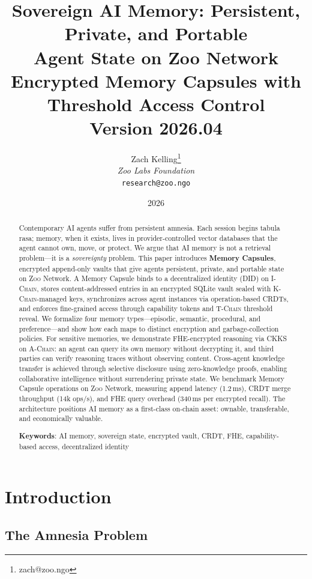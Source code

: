 \documentclass[11pt,letterpaper]{article}
\title{\textbf{Sovereign AI Memory: Persistent, Private, and Portable\\Agent State on Zoo Network}\\
\large Encrypted Memory Capsules with Threshold Access Control\\
\vspace{5pt}
\normalsize Version 2026.04}
\author{
Zach Kelling\thanks{zach@zoo.ngo}\\
\textit{Zoo Labs Foundation}\\
\texttt{research@zoo.ngo}
}
\date{2026}
\theoremstyle{definition}
\theoremstyle{remark}
\newcommand{\Zoo}{\textsc{Zoo}}
\newcommand{\AChain}{\textsc{A-Chain}}
\newcommand{\IChain}{\textsc{I-Chain}}
\newcommand{\KChain}{\textsc{K-Chain}}
\newcommand{\TChain}{\textsc{T-Chain}}
\newcommand{\CKKS}{\textsc{CKKS}}
\newcommand{\CRDT}{\textsc{CRDT}}
\newcommand{\DID}{\textsc{DID}}
\newcommand{\FHE}{\textsc{FHE}}
\begin{document}
\zoocoverpage

\begin{abstract}
Contemporary AI agents suffer from persistent amnesia. Each session begins tabula rasa; memory, when it exists, lives in provider-controlled vector databases that the agent cannot own, move, or protect. We argue that AI memory is not a retrieval problem---it is a \emph{sovereignty} problem. This paper introduces \textbf{Memory Capsules}, encrypted append-only vaults that give agents persistent, private, and portable state on \Zoo{} Network. A Memory Capsule binds to a decentralized identity (\DID{}) on \IChain{}, stores content-addressed entries in an encrypted SQLite vault sealed with \KChain{}-managed keys, synchronizes across agent instances via operation-based \CRDT{}s, and enforces fine-grained access through capability tokens and \TChain{} threshold reveal. We formalize four memory types---episodic, semantic, procedural, and preference---and show how each maps to distinct encryption and garbage-collection policies. For sensitive memories, we demonstrate \FHE{}-encrypted reasoning via \CKKS{} on \AChain{}: an agent can query its own memory without decrypting it, and third parties can verify reasoning traces without observing content. Cross-agent knowledge transfer is achieved through selective disclosure using zero-knowledge proofs, enabling collaborative intelligence without surrendering private state. We benchmark Memory Capsule operations on \Zoo{} Network, measuring append latency (1.2\,ms), \CRDT{} merge throughput (14k ops/s), and \FHE{} query overhead (340\,ms per encrypted recall). The architecture positions AI memory as a first-class on-chain asset: ownable, transferable, and economically valuable.

\textbf{Keywords}: AI memory, sovereign state, encrypted vault, CRDT, FHE, capability-based access, decentralized identity
\end{abstract}

\tableofcontents
\newpage

\section{Introduction}
\label{sec:intro}

\subsection{The Amnesia Problem}
\end{document}
